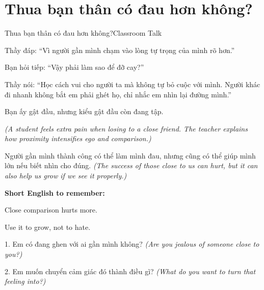 \section{Thua bạn thân có đau hơn không?}
\begin{truyen}{Thua bạn thân có đau hơn không?}{Classroom Talk}

Thầy đáp: ``Vì người gần mình chạm vào lòng tự trọng của mình rõ hơn.''

Bạn hỏi tiếp: ``Vậy phải làm sao để đỡ cay?''

Thầy nói: ``Học cách vui cho người ta mà không tự bỏ cuộc với mình. Người khác đi nhanh không bắt em phải ghét họ, chỉ nhắc em nhìn lại đường mình.''

Bạn ấy gật đầu, nhưng kiểu gật đầu còn đang tập.

\textit{(A student feels extra pain when losing to a close friend. The teacher explains how proximity intensifies ego and comparison.)}
\end{truyen}

\begin{baihoc}
Người gần mình thành công có thể làm mình đau, nhưng cũng có thể giúp mình lớn nếu biết nhìn cho đúng.
\textit{(The success of those close to us can hurt, but it can also help us grow if we see it properly.)}
\end{baihoc}

\begin{ghinhoanh}
\textbf{Short English to remember:}

Close comparison hurts more.

Use it to grow, not to hate.
\end{ghinhoanh}

\begin{tuhocnhanh}
1. Em có đang ghen với ai gần mình không? \textit{(Are you jealous of someone close to you?)}

2. Em muốn chuyển cảm giác đó thành điều gì? \textit{(What do you want to turn that feeling into?)}
\end{tuhocnhanh}
\ngancach

